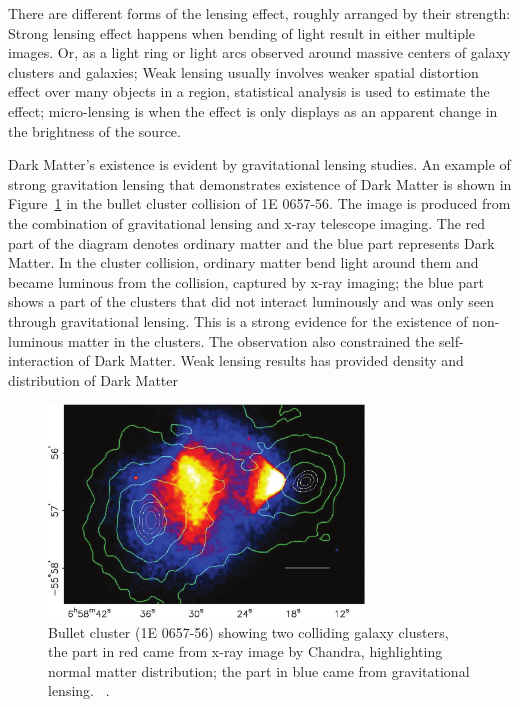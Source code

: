     There are different forms of the lensing effect, roughly arranged by their strength: Strong lensing effect happens when bending of light result in either multiple images. Or, as a light ring or light arcs observed around massive centers of galaxy clusters and galaxies; Weak lensing usually involves weaker spatial distortion effect over many objects in a region, statistical analysis is used to estimate the effect; micro-lensing is when the effect is only displays as an apparent change in the brightness of the source.

    Dark Matter's existence is evident by gravitational lensing studies. An example of strong gravitation lensing that demonstrates existence of Dark Matter is shown in Figure~\ref{fig:BulletCluster_figure} in the bullet cluster collision of 1E 0657-56. The image is produced from the combination of gravitational lensing and x-ray telescope imaging. The red part of the diagram denotes ordinary matter and the blue part represents Dark Matter. In the cluster collision, ordinary matter bend light around them and became luminous from the collision, captured by x-ray imaging; the blue part shows a part of the clusters that did not interact luminously and was only seen through gravitational lensing. This is a strong evidence for the existence of non-luminous matter in the clusters. The observation also constrained the self-interaction of Dark Matter.
    Weak lensing results has provided density and distribution of Dark Matter

\begin{figure}[!htb]
    \begin{center}
        \includegraphics[width=0.75\textwidth]{figures/chapter_DM/BulletCluster}
        \caption{
			Bullet cluster (1E 0657-56) showing two colliding galaxy clusters, the part in red came from x-ray image by Chandra, highlighting normal matter distribution; the part in blue came from gravitational lensing. ~\cite{BulletCluster}.
        }
        \label{fig:BulletCluster_figure}
    \end{center}
\end{figure}

